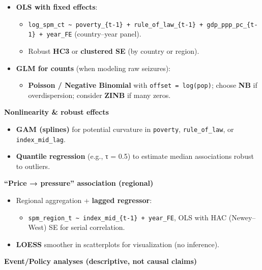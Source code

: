 \documentclass[
]{article}
\providecommand{\tightlist}{%
  \setlength{\itemsep}{0pt}\setlength{\parskip}{0pt}}
\begin{document}
\begin{itemize}
\item
  \textbf{OLS with fixed effects}:

  \begin{itemize}
  \tightlist
  \item
    \texttt{log\_spm\_ct\ \textasciitilde{}\ poverty\_\{t-1\}\ +\ rule\_of\_law\_\{t-1\}\ +\ gdp\_ppp\_pc\_\{t-1\}\ +\ year\_FE}
    (country--year panel).
  \item
    Robust \textbf{HC3} or \textbf{clustered SE} (by country or region).
  \end{itemize}
\item
  \textbf{GLM for counts} (when modeling raw seizures):

  \begin{itemize}
  \tightlist
  \item
    \textbf{Poisson / Negative Binomial} with
    \texttt{offset\ =\ log(pop)}; choose \textbf{NB} if overdispersion;
    consider \textbf{ZINB} if many zeros.
  \end{itemize}
\end{itemize}

\textbf{Nonlinearity \& robust effects}

\begin{itemize}
\tightlist
\item
  \textbf{GAM (splines)} for potential curvature in \texttt{poverty},
  \texttt{rule\_of\_law}, or \texttt{index\_mid\_lag}.
\item
  \textbf{Quantile regression} (e.g., τ = 0.5) to estimate median
  associations robust to outliers.
\end{itemize}

\textbf{``Price → pressure'' association (regional)}

\begin{itemize}
\item
  Regional aggregation + \textbf{lagged regressor}:

  \begin{itemize}
  \tightlist
  \item
    \texttt{spm\_region\_t\ \textasciitilde{}\ index\_mid\_\{t-1\}\ +\ year\_FE},
    OLS with HAC (Newey--West) SE for serial correlation.
  \end{itemize}
\item
  \textbf{LOESS} smoother in scatterplots for visualization (no
  inference).
\end{itemize}

\textbf{Event/Policy analyses (descriptive, not causal claims)}
\end{document}
